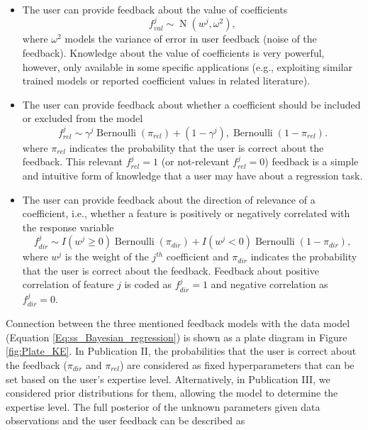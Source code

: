 \documentclass[dissertation,math,vertlayout,pdfa,colorlinks]{aaltoseries}
\DeclareMathOperator{\bernoullipdf}{Bernoulli}
\DeclareMathOperator{\normalpdf}{N}
\begin{document}
\begin{itemize}
	\item The user can provide feedback about the value of coefficients
	\begin{equation}\label{Eq:fb_on_val_coeff}
	f_{val}^{j} \sim \normalpdf(w^j, \omega^2),
	\end{equation}
	\noindent where $\omega^2$ models the variance of error in user feedback (noise of the feedback). Knowledge about the value of coefficients is very powerful, however, only available in some specific applications (e.g., exploiting similar trained models or reported coefficient values in related literature).
	 
	\item The user can provide feedback about whether a coefficient should be included or excluded from the model
	\begin{equation}\label{Eq:fb_on_rel_coeff}
	f_{rel}^{j} \sim \gamma^j \bernoullipdf(\pi_{rel}) + (1 - \gamma^j), \bernoullipdf(1 - \pi_{rel}).
	\end{equation}
	\noindent where $\pi_{rel}$ indicates the probability that the user is correct about the feedback. This relevant $f_{rel}^{j}=1$ (or not-relevant $f_{rel}^{j}=0$) feedback is a simple and intuitive form of knowledge that a user may have about a regression task.
	 
	\item The user can provide feedback about the direction of relevance of a coefficient, i.e., whether a feature is positively or negatively correlated with the response variable
	\begin{equation}\label{Eq:fb_on_dir_coeff}
	f_{dir}^{j} \sim I(w^j \geq 0) \bernoullipdf(\pi_{dir}) + I(w^j < 0) \bernoullipdf(1 - \pi_{dir}),
	\end{equation}
	\noindent where $w^j$ is the weight of the $j^{th}$ coefficient and $\pi_{dir}$ indicates the probability that the user is correct about the feedback. Feedback about positive correlation of feature $j$ is coded as $f_{dir}^{j}=1$ and negative correlation as $f_{dir}^{j}=0$.
\end{itemize}


\noindent Connection between the three mentioned feedback models with the data model (Equation \ref{Eq:ss_Bayesian_regression}) is shown as a plate diagram in Figure \ref{fig:Plate_KE}. In Publication II, the probabilities that the user is correct about the feedback ($\pi_{dir}$ and $\pi_{rel}$) are considered as fixed hyperparameters that can be set based on the user's expertise level. Alternatively, in Publication III, we considered prior distributions for them, allowing the model to determine the expertise level. The full posterior of the unknown parameters given data observations and the user feedback can be described as 
\end{document}
